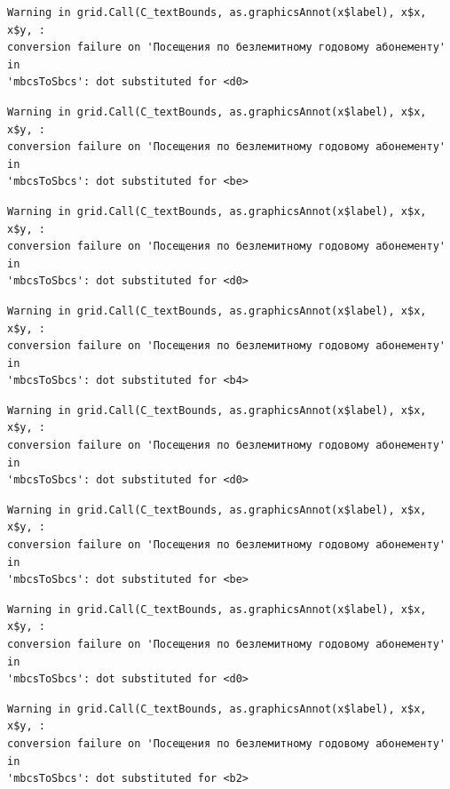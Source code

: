 \documentclass[
  letterpaper,
  DIV=11,
  numbers=noendperiod]{scrartcl}
\begin{document}
\begin{verbatim}
Warning in grid.Call(C_textBounds, as.graphicsAnnot(x$label), x$x, x$y, :
conversion failure on 'Посещения по безлемитному годовому абонементу' in
'mbcsToSbcs': dot substituted for <d0>
\end{verbatim}

\begin{verbatim}
Warning in grid.Call(C_textBounds, as.graphicsAnnot(x$label), x$x, x$y, :
conversion failure on 'Посещения по безлемитному годовому абонементу' in
'mbcsToSbcs': dot substituted for <be>
\end{verbatim}

\begin{verbatim}
Warning in grid.Call(C_textBounds, as.graphicsAnnot(x$label), x$x, x$y, :
conversion failure on 'Посещения по безлемитному годовому абонементу' in
'mbcsToSbcs': dot substituted for <d0>
\end{verbatim}

\begin{verbatim}
Warning in grid.Call(C_textBounds, as.graphicsAnnot(x$label), x$x, x$y, :
conversion failure on 'Посещения по безлемитному годовому абонементу' in
'mbcsToSbcs': dot substituted for <b4>
\end{verbatim}

\begin{verbatim}
Warning in grid.Call(C_textBounds, as.graphicsAnnot(x$label), x$x, x$y, :
conversion failure on 'Посещения по безлемитному годовому абонементу' in
'mbcsToSbcs': dot substituted for <d0>
\end{verbatim}

\begin{verbatim}
Warning in grid.Call(C_textBounds, as.graphicsAnnot(x$label), x$x, x$y, :
conversion failure on 'Посещения по безлемитному годовому абонементу' in
'mbcsToSbcs': dot substituted for <be>
\end{verbatim}

\begin{verbatim}
Warning in grid.Call(C_textBounds, as.graphicsAnnot(x$label), x$x, x$y, :
conversion failure on 'Посещения по безлемитному годовому абонементу' in
'mbcsToSbcs': dot substituted for <d0>
\end{verbatim}

\begin{verbatim}
Warning in grid.Call(C_textBounds, as.graphicsAnnot(x$label), x$x, x$y, :
conversion failure on 'Посещения по безлемитному годовому абонементу' in
'mbcsToSbcs': dot substituted for <b2>
\end{verbatim}
\end{document}
